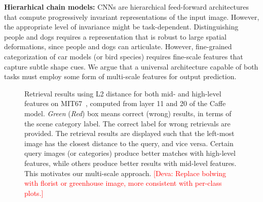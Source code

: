 \documentclass[10pt,twocolumn,letterpaper]{article}
\newcommand{\deva}[1]{\textcolor{red}{[Deva: #1]}}
\begin{document}
{\bf Hierarhical chain models:}  CNNs are 
hierarchical feed-forward architectures that compute progressively invariant representations of the input image. However, the appropriate level of invariance might be task-dependent. Distinguishing people and dogs requires a representation that is robust to large spatial deformations, since people and dogs can articulate. However, fine-grained categorization of car models (or bird species) requires fine-scale features that capture subtle shape cues. We argue that a universal architecture capable of both tasks must employ some form of multi-scale features for output prediction.

\begin{figure}
\centering

\caption{Retrieval results using L2 distance for both mid- and high-level features on MIT67~\cite{MIT67}, computed from layer 11 and 20 of the Caffe model. \textit{Green} (\textit{Red}) box means correct (wrong) results, in terms of the scene category label. The correct label for wrong retrievals are provided. The retrieval results are displayed such that the left-most image has the closest distance to the query, and vice versa. Certain query images (or categories) produce better matches with high-level features, while others produce better results with mid-level features. This motivates our multi-scale approach. \deva{Replace bolwing with florist or greenhouse image, more consistent with per-class plots.}}
\label{fig:moti}
\end{figure}
\end{document}
